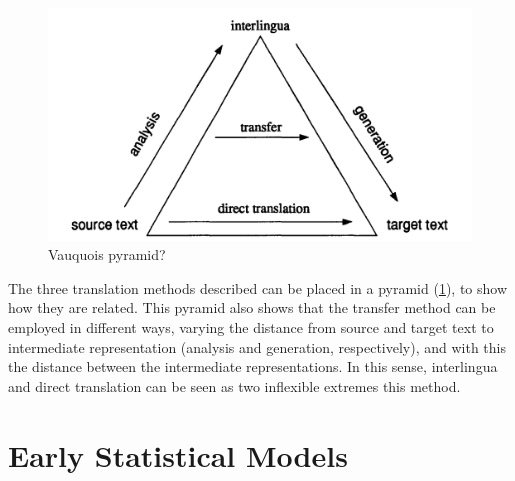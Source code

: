\documentclass{report}
\theoremstyle{definition}
\theoremstyle{plain}
\begin{document}
\begin{figure}[!ht]
\includegraphics[scale=0.2]{translation_triangle.png}
\caption{Vauquois pyramid?}\label{fig:triangle}
\end{figure}

The three translation methods described can be placed in a pyramid (\ref{fig:triangle}), to show how they are related. This pyramid also shows that the transfer method can be employed in different ways, varying the distance from source and target text to intermediate representation (analysis and generation, respectively), and with this the distance between the intermediate representations. In this sense, interlingua and direct translation can be seen as two inflexible extremes this method.

\section{Early Statistical Models}
\end{document}
